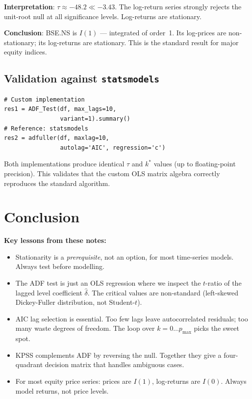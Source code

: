 \documentclass[10pt,a4paper,twocolumn]{article}
\begin{document}
\textbf{Interpretation}: $\tau \approx -48.2 \ll -3.43$.  The
log-return series strongly rejects the unit-root null at all
significance levels.  Log-returns are stationary.

\textbf{Conclusion}: BSE.NS is $I(1)$ --- integrated of order~1.
Its log-prices are non-stationary; its log-returns are stationary.
This is the standard result for major equity indices.

\subsection{Validation against \texttt{statsmodels}}

\begin{lstlisting}[style=pythonplain]
# Custom implementation
res1 = ADF_Test(df, max_lags=10,
                variant=1).summary()
# Reference: statsmodels
res2 = adfuller(df, maxlag=10,
                autolag='AIC', regression='c')
\end{lstlisting}

Both implementations produce identical $\tau$ and $k^*$ values
(up to floating-point precision).  This validates that the custom
OLS matrix algebra correctly reproduces the standard algorithm.

\section{Conclusion}

\textbf{Key lessons from these notes:}
\begin{itemize}\setlength\itemsep{2pt}
  \item Stationarity is a \emph{prerequisite}, not an option, for
        most time-series models.  Always test before modelling.

  \item The ADF test is just an OLS regression where we inspect the
        $t$-ratio of the lagged level coefficient $\hat\delta$.
        The critical values are non-standard (left-skewed
        Dickey-Fuller distribution, not Student-$t$).

  \item AIC lag selection is essential.  Too few lags leave
        autocorrelated residuals; too many waste degrees of freedom.
        The loop over $k=0\ldots p_{\max}$ picks the sweet spot.

  \item KPSS complements ADF by reversing the null.  Together they
        give a four-quadrant decision matrix that handles ambiguous
        cases.

  \item For most equity price series: prices are $I(1)$, log-returns
        are $I(0)$.  Always model returns, not price levels.
\end{itemize}
\end{document}
